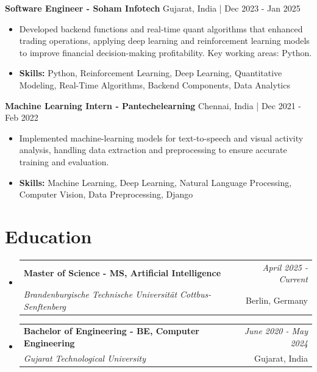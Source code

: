 \documentclass[a4paper,11pt]{article}
\makeatletter
\newcommand{\resumeSubheading}[4]{
\vspace{0.5mm}\item
    \begin{tabular*}{\linewidth}[t]{l@{\extracolsep{\fill}}r}
        \textbf{#1} & \textit{\footnotesize{#4}} \\
        \textit{\footnotesize{#3}} &  \footnotesize{#2}\\
    \end{tabular*}
    \vspace{-2.4mm}
}
\makeatother
\begin{document}
\vspace{1mm}
  \textbf{Software Engineer - Soham Infotech} \hfill Gujarat, India | Dec 2023 - Jan 2025
\vspace{-1.5mm} %
\begin{itemize}
  \item Developed backend functions and real-time quant algorithms that enhanced trading operations, applying deep learning and reinforcement learning models to improve financial decision-making profitability. Key working areas: Python.

\vspace{-2mm}
  \item \textbf{Skills:} Python, Reinforcement Learning, Deep Learning, Quantitative Modeling, Real-Time Algorithms, Backend Components, Data Analytics
\end{itemize}

\vspace{1mm}
  \textbf{Machine Learning Intern - Pantechelearning} \hfill Chennai, India | Dec 2021 - Feb 2022
\vspace{-1.5mm} %
\begin{itemize}
  \item Implemented machine-learning models for text-to-speech and visual activity analysis, handling data extraction and preprocessing to ensure accurate training and evaluation.
\vspace{-2mm}
  \item \textbf{Skills:} Machine Learning, Deep Learning, Natural Language Processing, Computer Vision, Data Preprocessing, Django
\end{itemize}\section{\textbf{Education}}
\vspace{-0.4mm}

\begin{itemize}[leftmargin=0.15in, label={}]
\resumeSubheading
{Master of Science - MS, Artificial Intelligence }{Berlin, Germany}
{Brandenburgische Technische Universität Cottbus-Senftenberg  }{April 2025 - Current}

\vspace{1.0mm} %
\resumeSubheading
{Bachelor of Engineering - BE, Computer Engineering  }{Gujarat, India}
{Gujarat Technological University }{June 2020 - May 2024}

\end{itemize}
\end{document}

